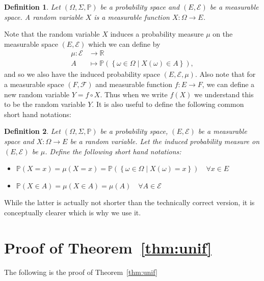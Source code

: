 \documentclass{article}
\newcommand{\set}[2]{\left\{ #1 \middle| #2 \right\}}
\newtheorem{definition}{Definition}
\theoremstyle{remark}
\renewcommand{\P}{\mathbb{P}}
\begin{document}
\begin{definition}
	Let $(\Omega, \Sigma, \P)$ be a probability space and $(E, \mathcal{E})$ be
	a measurable space. A random variable $X$ is a measurable function $X:
	\Omega \to E$.
\end{definition}

Note that the random variable $X$ induces a probability measure $\mu$ on the
measurable space $(E, \mathcal{E})$ which we can define by
\begin{align*}
	\mu: \mathcal{E} &\to \mathbb{R}\\
	A &\mapsto \P(\set{\omega \in \Omega}{X(\omega) \in A}),
\end{align*}
and so we also have the induced probability space $(E, \mathcal{E}, \mu)$. Also
note that for a measurable space $(F, \mathcal{F})$ and measurable function $f:
E \to F$, we can define a new random variable $Y = f \circ X$. Thus when we
write $f(X)$ we understand this to be the random variable $Y$. It is also
useful to define the following common short hand notations:

\begin{definition}
	Let $(\Omega, \Sigma, \P)$ be a probability space, $(E, \mathcal{E})$ be a
	measurable space and $X: \Omega \to E$ be a random variable. Let the
	induced probability measure on $(E, \mathcal{E})$ be $\mu$. Define the
	following short hand notations:
	\begin{itemize}
		\item $\P(X = x) = \mu(X = x) = \P(\set{\omega \in
			\Omega}{X(\omega) = x}) \quad \forall x \in E$
		\item $\P(X \in A) = \mu(X \in A) = \mu(A) \quad \forall A \in
			\mathcal{E}$
	\end{itemize}
\end{definition}

While the latter is actually not shorter than the technically correct version,
it is conceptually clearer which is why we use it.

\section{Proof of Theorem~\ref{thm:unif}}\label{app:unif}

The following is the proof of Theorem~\ref{thm:unif}
\end{document}
